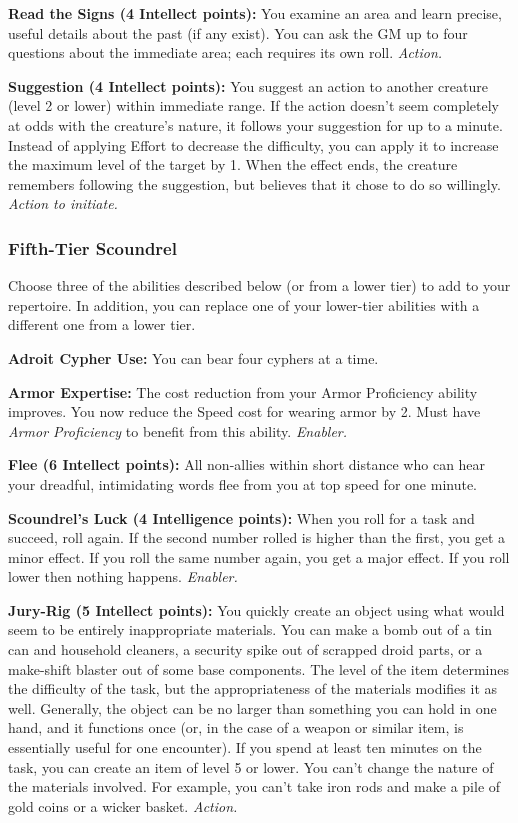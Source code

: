 \documentclass[a4paper,10pt,final,twocolumn,oneside]{book}
\newcommand{\itemAbility}[2]{\textcolor{25gray}{\textbullet\textbf{ #1:}}{ #2}\par}
\newcommand{\enabler}{\textit{ Enabler.}}
\newcommand{\action}{\textit{ Action.}}
\newcommand{\actionInit}{\textit{ Action to initiate.}}
\begin{document}
\itemAbility{Read the Signs (4 Intellect points)}{You examine an area and learn precise, useful details about the past (if any exist). You can ask the GM up to four questions about the immediate area; each requires its own roll. \action}

\itemAbility{Suggestion (4 Intellect points)}{You suggest an action to another creature (level 2 or lower) within immediate range. If the action doesn’t seem completely at odds with the creature’s nature, it follows your suggestion for up to a minute. Instead of applying Effort to decrease the difficulty, you can apply it to increase the maximum level of the target by 1. When the effect ends, the creature remembers following the suggestion, but believes that it chose to do so willingly. \actionInit}


\subsubsection*{Fifth-Tier Scoundrel}
\label{subsub:scoundrelFifthTier}

Choose three of the abilities described below (or from a lower tier) to add to your repertoire. In addition, you can replace one of your lower-tier abilities with a different one from a lower tier.

\itemAbility{Adroit Cypher Use}{You can bear four cyphers at a time.}

\itemAbility{Armor Expertise}{The cost reduction from your Armor Proficiency ability improves. You now reduce the Speed cost for wearing armor by 2. Must have \textit{Armor Proficiency} to benefit from this ability.\enabler}

\itemAbility{Flee (6 Intellect points)}{All non-allies within short distance who can hear your dreadful, intimidating words flee from you at top speed for one minute.}

\itemAbility{Scoundrel's Luck (4 Intelligence points)}{When you roll for a task and succeed, roll again. If the second number rolled is higher than the first, you get a minor effect. If you roll the same number again, you get a major effect. If you roll lower then nothing happens. \enabler}

\itemAbility{Jury-Rig (5 Intellect points)}{You quickly create an object using what would seem to be entirely inappropriate materials. You can make a bomb out of a tin can and household cleaners, a security spike out of scrapped droid parts, or a make-shift blaster out of some base components. The level of the item determines the difficulty of the task, but the appropriateness of the materials modifies it as well. Generally, the object can be no larger than something you can hold in one hand, and it functions once (or, in the case of a weapon or similar item, is essentially useful for one encounter). If you spend at least ten minutes on the task, you can create an item of level 5 or lower. You can’t change the nature of the materials involved. For example, you can’t take iron rods and make a pile of gold coins or a wicker basket.\action}
\end{document}
